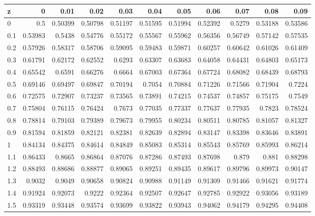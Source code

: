 \documentclass[twoside]{book}
\begin{document}
\begin{table}[!h]
\centering
\footnotesize
\begin{tabular}{l|*{10}{r}}
\toprule
z   & 0       & 0.01    & 0.02    & 0.03    & 0.04    & 0.05    & 0.06    & 0.07    & 0.08    & 0.09    \\
\midrule
0   & 0.5     & 0.50399 & 0.50798 & 0.51197 & 0.51595 & 0.51994 & 0.52392 & 0.5279  & 0.53188 & 0.53586 \\
0.1 & 0.53983 & 0.5438  & 0.54776 & 0.55172 & 0.55567 & 0.55962 & 0.56356 & 0.56749 & 0.57142 & 0.57535 \\
0.2 & 0.57926 & 0.58317 & 0.58706 & 0.59095 & 0.59483 & 0.59871 & 0.60257 & 0.60642 & 0.61026 & 0.61409 \\
0.3 & 0.61791 & 0.62172 & 0.62552 & 0.6293  & 0.63307 & 0.63683 & 0.64058 & 0.64431 & 0.64803 & 0.65173 \\
0.4 & 0.65542 & 0.6591  & 0.66276 & 0.6664  & 0.67003 & 0.67364 & 0.67724 & 0.68082 & 0.68439 & 0.68793 \\
0.5 & 0.69146 & 0.69497 & 0.69847 & 0.70194 & 0.7054  & 0.70884 & 0.71226 & 0.71566 & 0.71904 & 0.7224  \\
0.6 & 0.72575 & 0.72907 & 0.73237 & 0.73565 & 0.73891 & 0.74215 & 0.74537 & 0.74857 & 0.75175 & 0.7549  \\
0.7 & 0.75804 & 0.76115 & 0.76424 & 0.7673  & 0.77035 & 0.77337 & 0.77637 & 0.77935 & 0.7823  & 0.78524 \\
0.8 & 0.78814 & 0.79103 & 0.79389 & 0.79673 & 0.79955 & 0.80234 & 0.80511 & 0.80785 & 0.81057 & 0.81327 \\
0.9 & 0.81594 & 0.81859 & 0.82121 & 0.82381 & 0.82639 & 0.82894 & 0.83147 & 0.83398 & 0.83646 & 0.83891 \\
1   & 0.84134 & 0.84375 & 0.84614 & 0.84849 & 0.85083 & 0.85314 & 0.85543 & 0.85769 & 0.85993 & 0.86214 \\
1.1 & 0.86433 & 0.8665  & 0.86864 & 0.87076 & 0.87286 & 0.87493 & 0.87698 & 0.879   & 0.881   & 0.88298 \\
1.2 & 0.88493 & 0.88686 & 0.88877 & 0.89065 & 0.89251 & 0.89435 & 0.89617 & 0.89796 & 0.89973 & 0.90147 \\
1.3 & 0.9032  & 0.9049  & 0.90658 & 0.90824 & 0.90988 & 0.91149 & 0.91309 & 0.91466 & 0.91621 & 0.91774 \\
1.4 & 0.91924 & 0.92073 & 0.9222  & 0.92364 & 0.92507 & 0.92647 & 0.92785 & 0.92922 & 0.93056 & 0.93189 \\
1.5 & 0.93319 & 0.93448 & 0.93574 & 0.93699 & 0.93822 & 0.93943 & 0.94062 & 0.94179 & 0.94295 & 0.94408 \\

\end{tabular}
\end{table}
\end{document}
